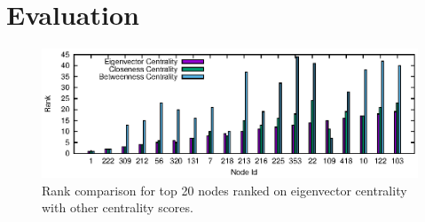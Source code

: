 \section{Evaluation}
\label{eval}

%
%
%
%
%
%
%
%
%
%
%
%
%
%
%
%
%
%
%
\begin{figure}[ht]
    \centering
    \includegraphics[width=1\textwidth]{figures/social-result_eigen.eps}
    \caption{Rank comparison for top 20 nodes ranked on eigenvector centrality with other centrality scores.}
    \label{fig:social-result-eigen}
\end{figure}

